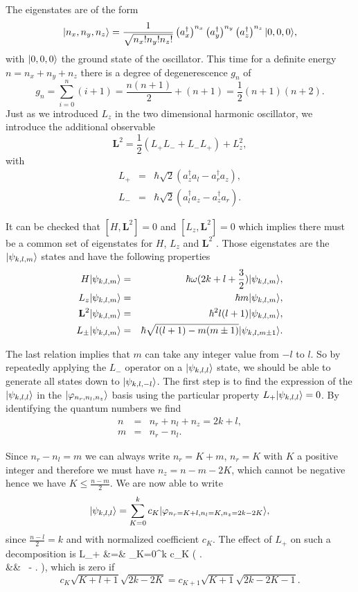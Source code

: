 The eigenstates are of the form
\[  | n_x,n_y,n_z \rangle = \frac{1}{\sqrt{n_x! n_y!n_z!}} \left( a_x^\dagger \right)^{n_x}  \left( a_y^\dagger \right)^{n_y} \left( a_z^\dagger \right)^{n_z} | 0,0,0 \rangle, \]
with $| 0,0,0 \rangle$ the ground state of the oscillator. This time for a definite energy $n=n_x+n_y+n_z$ there is a degree of degenerescence $g_n$ of
\[ g_n = \sum_{i=0}^n (i+1) = \frac{n(n+1)}{2} + (n+1) = \frac 1 2 (n+1)(n+2). \]
Just as we introduced $L_z$ in the two dimensional harmonic oscillator, we introduce the additional observable
\[ \mathbf{L}^2 = \frac 1 2 (L_+ L_- + L_- L_+) + L_z^2, \]
with
\begin{eqnarray}
L_+ &=& \hbar \sqrt 2 (a^\dagger_z a_l - a^\dagger_r a_z), \\ 
L_- &=& \hbar \sqrt 2 (a^\dagger_l a_z - a^\dagger_z a_r). 
\end{eqnarray}

It can be checked that $[H,\mathbf{L}^2]=0$ and $[L_z,\mathbf{L}^2]=0$ which implies there must be a common set of eigenstates for $H$, $L_z$ and $\mathbf{L}^2$ . Those eigenstates are the $| \psi_{k,l,m} \rangle$ states and have the following properties
\begin{eqnarray}
H | \psi_{k,l,m} \rangle &=& \hbar \omega(2k+l+\frac 3 2) | \psi_{k,l,m} \rangle,\\
L_z | \psi_{k,l,m} \rangle &=& \hbar m | \psi_{k,l,m} \rangle,\\
\mathbf{L}^2 | \psi_{k,l,m} \rangle &=& \hbar^2 l(l+1) | \psi_{k,l,m} \rangle, \\
L_\pm | \psi_{k,l,m} \rangle &=& \hbar \sqrt{l(l+1)-m(m\pm1)} | \psi_{k,l,m\pm1} \rangle.\\
\end{eqnarray}

The last relation implies that $m$ can take any integer value from $-l$ to $l$. So by repeatedly applying the $L_-$ operator on a $| \psi_{k,l,l} \rangle$ state, we should be able to generate all states down to $| \psi_{k,l,-l} \rangle$. The first step is to find the expression of the $| \psi_{k,l,l} \rangle$ in the $| \varphi_{n_r,n_l,n_z} \rangle$ basis using the particular property $L_+ | \psi_{k,l,l} \rangle = 0$. By identifying the quantum numbers we find
\begin{eqnarray}
n&=& n_r + n_l + n_z = 2k+ l, \\ 
m &=& n_r - n_l.
\end{eqnarray}

Since $n_r-n_l=m$ we can always write $n_r = K+m$, $n_r=K$ with $K$ a positive integer and therefore we must have $n_z=n-m-2K$, which cannot be negative hence we have $K \le \frac{n-m}{2}$.  We are now able to write
\[ | \psi_{k,l,l} \rangle = \sum_{K=0}^k c_K | \varphi_{n_r=K+l, n_l=K, n_z = 2k-2K} \rangle, \]
since $\frac{n-l}{2} = k$ and with normalized coefficient $c_K$. The effect of $L_+$ on such a decomposition is
\bea
L_+  &=& \sum_{K=0}^k c_K  \hbar \left(    \right. \nonumber \\
&& \ - \left.   \right), 
\eea
which is zero if 
\[ c_K  \sqrt{K+l+1}\sqrt{2k-2K} = c_{K+1} \sqrt{K+1} \sqrt{2k-2K-1}. \]

